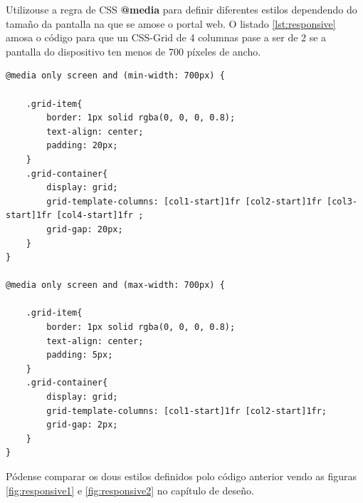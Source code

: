 Utilizouse a regra de CSS \textbf{@media} para definir diferentes estilos dependendo do tamaño da pantalla na que se amose o portal web. O listado \ref{lst:responsive} amosa o código para que un CSS-Grid de 4 columnas pase a ser de 2 se a pantalla do dispositivo ten menos de 700 píxeles de ancho. 

\begin{lstlisting}[caption=Extracto da folla de estilos de index.html, label=lst:responsive]
@media only screen and (min-width: 700px) {

	.grid-item{
		border: 1px solid rgba(0, 0, 0, 0.8);
		text-align: center;
		padding: 20px;
	}
	.grid-container{
		display: grid;
		grid-template-columns: [col1-start]1fr [col2-start]1fr [col3-start]1fr [col4-start]1fr ;
		grid-gap: 20px;
	}
}

@media only screen and (max-width: 700px) {

	.grid-item{
		border: 1px solid rgba(0, 0, 0, 0.8);
		text-align: center;
		padding: 5px;
	}
	.grid-container{
		display: grid;
		grid-template-columns: [col1-start]1fr [col2-start]1fr;
		grid-gap: 2px;
	}
}
\end{lstlisting}

Pódense comparar os dous estilos definidos polo código anterior vendo as figuras \ref{fig:responsive1} e \ref{fig:responsive2} no capítulo de deseño.

